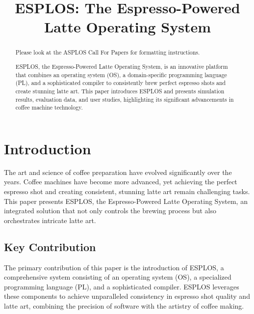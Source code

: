 \documentclass[nonacm,sigplan]{acmart}
\begin{document}
\title{ESPLOS: The Espresso-Powered Latte Operating System}


\begin{abstract}
Please look at the ASPLOS Call For Papers for formatting instructions. 

ESPLOS, the Espresso-Powered Latte Operating System, is an innovative platform that combines an operating system (OS), a domain-specific programming language (PL), and a sophisticated compiler to consistently brew perfect espresso shots and create stunning latte art. This paper introduces ESPLOS and presents simulation results, evaluation data, and user studies, highlighting its significant advancements in coffee machine technology.
\end{abstract}

\maketitle %
\pagestyle{plain} %


\section{Introduction}
The art and science of coffee preparation have evolved significantly over the years. Coffee machines have become more advanced, yet achieving the perfect espresso shot and creating consistent, stunning latte art remain challenging tasks. This paper presents ESPLOS, the Espresso-Powered Latte Operating System, an integrated solution that not only controls the brewing process but also orchestrates intricate latte art.

\subsection{Key Contribution}
The primary contribution of this paper is the introduction of ESPLOS, a comprehensive system consisting of an operating system (OS), a specialized programming language (PL), and a sophisticated compiler. ESPLOS leverages these components to achieve unparalleled consistency in espresso shot quality and latte art, combining the precision of software with the artistry of coffee making.
\end{document}

